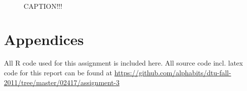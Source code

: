 \begin{figure}
    \centering
    \mbox{  
         \quad 
    }
    \caption{CAPTION!!!}
    \label{fig:label}
\end{figure}



\pagebreak
\section*{Appendices}
All R code used for this assignment is included here. All source code incl. latex code for this report can be found at {\small\url{https://github.com/alphabits/dtu-fall-2011/tree/master/02417/assignment-3}}

\pagebreak




